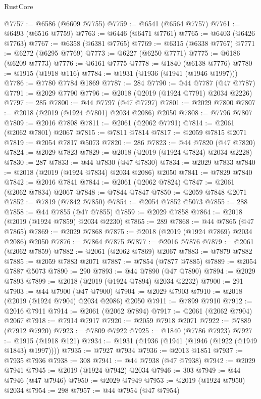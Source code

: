 \begin{lexlean}{RustCore}
\begin{coremodule}
@7757 := @6586 (@6609 @7755)
@7759 := @6541 (@6564 @7757)
@7761 := @6493 (@6516 @7759)
@7763 := @6446 (@6471 @7761)
@7765 := @6403 (@6426 @7763)
@7767 := @6358 (@6381 @7765)
@7769 := @6315 (@6338 @7767)
@7771 := @6272 (@6295 @7769)
@7773 := @6227 (@6250 @7771)
@7775 := @6186 (@6209 @7773)
@7776 := @6161 @7775
@7778 := @1840 (@6138 @7776)
@7780 := @1915 (@1918 @116)
@7784 := @1931 (@1936 (@1941 (@1946 @1997)))
@7786 := @7780 @7784 @1869
@7787 := 284
@7790 := @44 @7787 (@47 @7787)
@7791 := @2029 @7790
@7796 := @2018 (@2019 (@1924 @7791) @2034 @2226)
@7797 := 285
@7800 := @44 @7797 (@47 @7797)
@7801 := @2029 @7800
@7807 := @2018 (@2019 (@1924 @7801) @2034 @2086) @2050
@7808 := @7796 @7807
@7809 := @2016 @7808
@7811 := @2061 (@2062 @7791)
@7814 := @2061 (@2062 @7801) @2067
@7815 := @7811 @7814
@7817 := @2059 @7815 @2071
@7819 := @2054 @7817 @5073
@7820 := 286
@7823 := @44 @7820 (@47 @7820)
@7824 := @2029 @7823
@7829 := @2018 (@2019 (@1924 @7824) @2034 @2228)
@7830 := 287
@7833 := @44 @7830 (@47 @7830)
@7834 := @2029 @7833
@7840 := @2018 (@2019 (@1924 @7834) @2034 @2086) @2050
@7841 := @7829 @7840
@7842 := @2016 @7841
@7844 := @2061 (@2062 @7824)
@7847 := @2061 (@2062 @7834) @2067
@7848 := @7844 @7847
@7850 := @2059 @7848 @2071
@7852 := @7819 (@7842 @7850)
@7854 := @2054 @7852 @5073
@7855 := 288
@7858 := @44 @7855 (@47 @7855)
@7859 := @2029 @7858
@7864 := @2018 (@2019 (@1924 @7859) @2034 @2230)
@7865 := 289
@7868 := @44 @7865 (@47 @7865)
@7869 := @2029 @7868
@7875 := @2018 (@2019 (@1924 @7869) @2034 @2086) @2050
@7876 := @7864 @7875
@7877 := @2016 @7876
@7879 := @2061 (@2062 @7859)
@7882 := @2061 (@2062 @7869) @2067
@7883 := @7879 @7882
@7885 := @2059 @7883 @2071
@7887 := @7854 (@7877 @7885)
@7889 := @2054 @7887 @5073
@7890 := 290
@7893 := @44 @7890 (@47 @7890)
@7894 := @2029 @7893
@7899 := @2018 (@2019 (@1924 @7894) @2034 @2232)
@7900 := 291
@7903 := @44 @7900 (@47 @7900)
@7904 := @2029 @7903
@7910 := @2018 (@2019 (@1924 @7904) @2034 @2086) @2050
@7911 := @7899 @7910
@7912 := @2016 @7911
@7914 := @2061 (@2062 @7894)
@7917 := @2061 (@2062 @7904) @2067
@7918 := @7914 @7917
@7920 := @2059 @7918 @2071
@7922 := @7889 (@7912 @7920)
@7923 := @7809 @7922
@7925 := @1840 (@7786 @7923)
@7927 := @1915 (@1918 @121)
@7934 := @1931 (@1936 (@1941 (@1946 (@1922 (@1949 @1843) @1997))))
@7935 := @7927 @7934
@7936 := @2013 @1851
@7937 := @7935 @7936
@7938 := 308
@7941 := @44 @7938 (@47 @7938)
@7942 := @2029 @7941
@7945 := @2019 (@1924 @7942) @2034
@7946 := 303
@7949 := @44 @7946 (@47 @7946)
@7950 := @2029 @7949
@7953 := @2019 (@1924 @7950) @2034
@7954 := 298
@7957 := @44 @7954 (@47 @7954)

\end{coremodule}
\end{lexlean}
